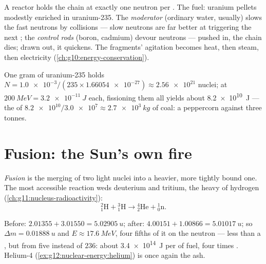 \begin{definition}\label{def:g12:nuclear-energy:reactor}
A  reactor holds the chain at exactly one neutron per . The fuel:
uranium pellets modestly enriched in uranium-235. The
\emph{moderator} (ordinary water, usually) slows the fast
 neutrons by collisions --- slow neutrons are far better at triggering
the next ; the \emph{control rods} (boron, cadmium)
devour neutrons --- pushed in, the chain dies; drawn out, it quickens. The
fragments' agitation becomes heat, then steam, then electricity
(\cref{ch:g10:energy-conservation}).
\end{definition}

\begin{example}\label{ex:g12:nuclear-energy:gram}
One gram of uranium-235 holds
$N = \num{1.0e-3} / (235 \times \num{1.66054e-27}) \approx \num{2.56e21}$
nuclei; at $\qty{200}{MeV} = \qty{3.2e-11}{J}$ each, fissioning them all
yields about \qty{8.2e10}{J} --- the  of $\num{8.2e10} /
\num{3.0e7} \approx \qty{2.7e3}{kg}$ of coal: a peppercorn against three tonnes.
\end{example}

\section{Fusion: the Sun's own fire}

\begin{definition}[Fusion]\label{def:g12:nuclear-energy:fusion}
\emph{Fusion} is the merging of two light nuclei into a heavier,
more tightly bound one. The most accessible reaction weds deuterium and
tritium, the heavy  of hydrogen (\cref{ch:g11:nucleus-radioactivity}):
\[
{}^{2}_{1}\mathrm{H} + {}^{3}_{1}\mathrm{H} \longrightarrow
{}^{4}_{2}\mathrm{He} + {}^{1}_{0}\mathrm{n}.
\]
\end{definition}

\begin{example}[D--T, weighed]\label{ex:g12:nuclear-energy:dt}
Before: $2.01355 + 3.01550 = \qty{5.02905}{u}$; after:
$4.00151 + 1.00866 = \qty{5.01017}{u}$; so $\Delta m = \qty{0.01888}{u}$ and
$E \approx \qty{17.6}{MeV}$, four fifths of it on the neutron --- less than a
, but from five  instead of $236$: about \qty{3.4e14}{J} per
 of fuel, four times . Helium-4
(\cref{ex:g12:nuclear-energy:helium}) is once again the ash.
\end{example}

